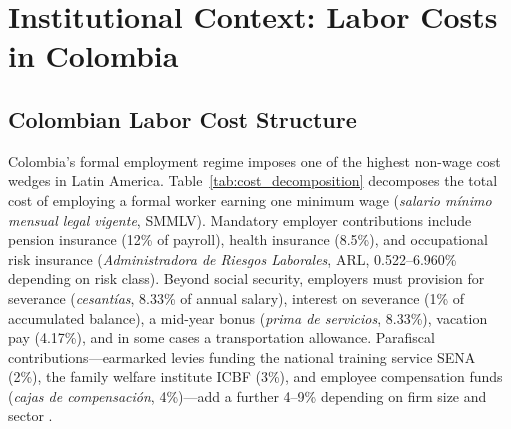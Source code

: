 \documentclass[5p,times,authoryear]{elsarticle}
\begin{document}
\FloatBarrier


\section{Institutional Context: Labor Costs in Colombia}
\label{sec:context}

\subsection{Colombian Labor Cost Structure}
\label{subsec:labor_costs}

Colombia's formal employment regime imposes one of the highest non-wage cost wedges in Latin America. Table~\ref{tab:cost_decomposition} decomposes the total cost of employing a formal worker earning one minimum wage (\textit{salario m\'{i}nimo mensual legal vigente}, SMMLV). Mandatory employer contributions include pension insurance (12\% of payroll), health insurance (8.5\%), and occupational risk insurance (\textit{Administradora de Riesgos Laborales}, ARL, 0.522--6.960\% depending on risk class). Beyond social security, employers must provision for severance (\textit{cesant\'{i}as}, 8.33\% of annual salary), interest on severance (1\% of accumulated balance), a mid-year bonus (\textit{prima de servicios}, 8.33\%), vacation pay (4.17\%), and in some cases a transportation allowance. Parafiscal contributions---earmarked levies funding the national training service SENA (2\%), the family welfare institute ICBF (3\%), and employee compensation funds (\textit{cajas de compensaci\'{o}n}, 4\%)---add a further 4--9\% depending on firm size and sector \citep{anif2018}.
\end{document}
